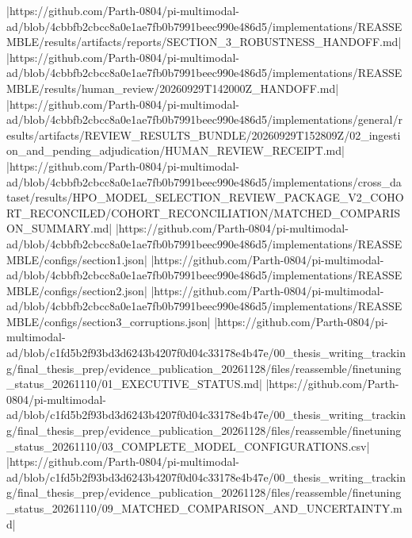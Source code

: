 |https://github.com/Parth-0804/pi-multimodal-ad/blob/4cbbfb2cbcc8a0e1ae7fb0b7991beec990e486d5/implementations/REASSEMBLE/results/artifacts/reports/SECTION_3_ROBUSTNESS_HANDOFF.md|
|https://github.com/Parth-0804/pi-multimodal-ad/blob/4cbbfb2cbcc8a0e1ae7fb0b7991beec990e486d5/implementations/REASSEMBLE/results/human_review/20260929T142000Z_HANDOFF.md|
|https://github.com/Parth-0804/pi-multimodal-ad/blob/4cbbfb2cbcc8a0e1ae7fb0b7991beec990e486d5/implementations/general/results/artifacts/REVIEW_RESULTS_BUNDLE/20260929T152809Z/02_ingestion_and_pending_adjudication/HUMAN_REVIEW_RECEIPT.md|
|https://github.com/Parth-0804/pi-multimodal-ad/blob/4cbbfb2cbcc8a0e1ae7fb0b7991beec990e486d5/implementations/cross_dataset/results/HPO_MODEL_SELECTION_REVIEW_PACKAGE_V2_COHORT_RECONCILED/COHORT_RECONCILIATION/MATCHED_COMPARISON_SUMMARY.md|
|https://github.com/Parth-0804/pi-multimodal-ad/blob/4cbbfb2cbcc8a0e1ae7fb0b7991beec990e486d5/implementations/REASSEMBLE/configs/section1.json|
|https://github.com/Parth-0804/pi-multimodal-ad/blob/4cbbfb2cbcc8a0e1ae7fb0b7991beec990e486d5/implementations/REASSEMBLE/configs/section2.json|
|https://github.com/Parth-0804/pi-multimodal-ad/blob/4cbbfb2cbcc8a0e1ae7fb0b7991beec990e486d5/implementations/REASSEMBLE/configs/section3_corruptions.json|
|https://github.com/Parth-0804/pi-multimodal-ad/blob/c1fd5b2f93bd3d6243b4207f0d04c33178e4b47e/00_thesis_writing_tracking/final_thesis_prep/evidence_publication_20261128/files/reassemble/finetuning_status_20261110/01_EXECUTIVE_STATUS.md|
|https://github.com/Parth-0804/pi-multimodal-ad/blob/c1fd5b2f93bd3d6243b4207f0d04c33178e4b47e/00_thesis_writing_tracking/final_thesis_prep/evidence_publication_20261128/files/reassemble/finetuning_status_20261110/03_COMPLETE_MODEL_CONFIGURATIONS.csv|
|https://github.com/Parth-0804/pi-multimodal-ad/blob/c1fd5b2f93bd3d6243b4207f0d04c33178e4b47e/00_thesis_writing_tracking/final_thesis_prep/evidence_publication_20261128/files/reassemble/finetuning_status_20261110/09_MATCHED_COMPARISON_AND_UNCERTAINTY.md|
